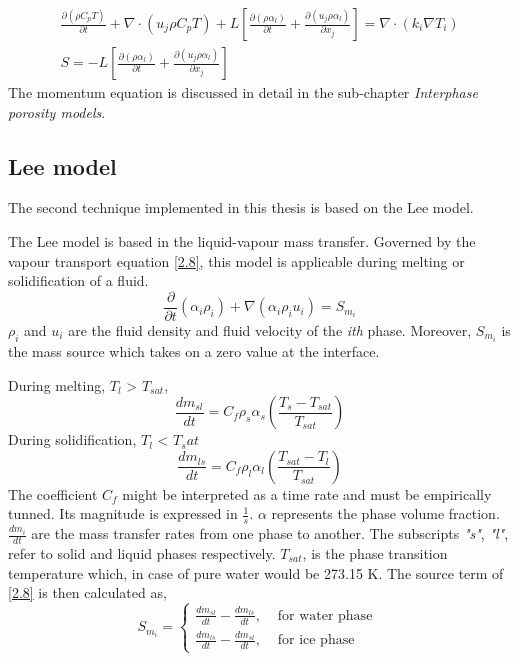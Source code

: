 \begin{equation}
	\begin{aligned}
		\frac{\partial (\rho C_{p} T)}{\partial t}+ \nabla \cdot\left(u_{j}\rho C_{p} T\right)+L\left[\frac{\partial (\rho \alpha_{l})}{\partial t}+ \frac{\partial (u_{j}\rho \alpha_{l})}{\partial x_{j}}\right]=\nabla \cdot\left(k_{i} \nabla T_{i}\right)  \\
		S = -L\left[\frac{\partial (\rho \alpha_{l})}{\partial t}+ \frac{\partial (u_{j}\rho \alpha_{l})}{\partial x_{j}}\right]
	\end{aligned}
	\label{2.7}
\end{equation}
The momentum equation is discussed in detail in the sub-chapter \textit{Interphase porosity models}.

\subsection{Lee model}

\setlength{\parindent}{0.5cm} The second technique implemented in this thesis is based on the Lee model.

\noindent The Lee model is based in the liquid-vapour mass transfer. Governed by the vapour transport equation \ref{2.8}, this model is applicable during melting or solidification of a fluid.
\begin{equation}
	\frac{\partial}{\partial t}\left(\alpha_{i} \rho_{i}\right)+\nabla\left(\alpha_{i} \rho_{i} {u}_{i}\right)=S_{m _i}
	\label{2.8}
\end{equation}
\textit{$\rho_i$} and \textbf{$u_i$} are the fluid density and fluid velocity of the \textit{i{th}} phase. Moreover, $S_{m_i}$ is the mass source which takes on a zero value at the interface.

\noindent During melting, $T_l$ > $T_{sat}$,
\begin{equation}
	\frac{d m_{s l}}{d t}=C_{f} \rho_{s} \alpha_{s}\left(\frac{T_{s}-T_{s a t}}{T_{s a t}}\right)
	\label{2.9}
\end{equation}
During solidification, $T_l$ < $T_sat$
\begin{equation}
	\label{2.10}
	\frac{d m_{l s}}{d t}=C_{f} \rho_{l} \alpha_{l}\left(\frac{T_{s a t}-T_{l}}{T_{s a t}}\right)
\end{equation}
The coefficient $C_f$ might be interpreted as a time rate and must be empirically tunned. Its magnitude is expressed in $\frac{1}{s}$. $\alpha$ represents the phase volume fraction. $\frac{d m_{i}}{d t}$ are the mass transfer rates from one phase to another. The subscripts \textit{"s"}, \textit{"l"}, refer to solid and liquid phases respectively. \textit{$T_{sat}$}, is the phase transition temperature which, in case of pure water would be 273.15 K.
The source term of \ref{2.8} is then calculated as,
\begin{equation}
	\label{2.11}
	S_{m_{i}}=\left\{\begin{array}{lr}
	\frac{d m_{s l}}{d t}-\frac{d m_{l s}}{d t}, & \text { for water phase } \\
	\frac{d m_{l s}}{d t}-\frac{d m_{s l}}{d t}, & \text { for ice phase }
	\end{array}\right.
\end{equation}  

